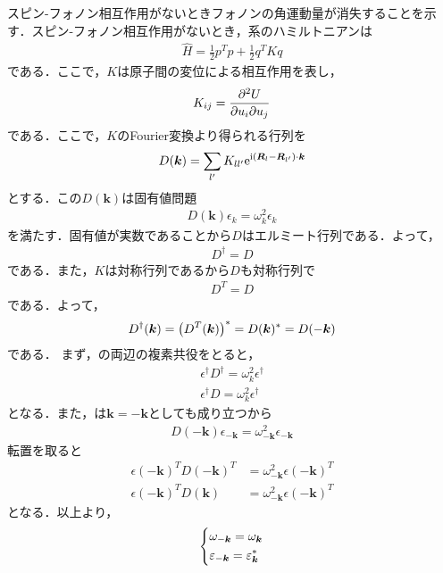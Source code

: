 \documentclass{report}
\begin{document}
スピン-フォノン相互作用がないときフォノンの角運動量が消失することを示す．スピン-フォノン相互作用がないとき，系のハミルトニアンは
\begin{align}
  \hat{H} = \frac{1}{2} p^T p + \frac{1}{2} q^T K q
\end{align}
である．ここで，$K$は原子間の変位による相互作用を表し，
\begin{align}
  K_{ij}  = \pdv[2]{U}{u_i}{u_j}
\end{align}
である．ここで，$K$のFourier変換より得られる行列を
\begin{align}
  D(\bm{k}) = \sum_{l'} K_{ll'} \mathrm{e}^{\mathrm{i}(\bm{R}_l - \bm{R}_{l'})\cdot\bm{k}}
\end{align}
とする．この$D(\bm{k})$は固有値問題
\begin{align}
  D(\bm{k})\epsilon_k = \omega_k^2 \epsilon_k \label{eigen}
\end{align}
を満たす．固有値が実数であることから$D$はエルミート行列である．よって，
\begin{align}
  D^\dagger = D
\end{align}
である．また，$K$は対称行列であるから$D$も対称行列で
\begin{align}
  D^T = D
\end{align}
である．よって，
\begin{align}
  D^\dagger(\bm{k}) = \qty(D^T(\bm{k}))^{*} = D(\bm{k})^{*} = D(-\bm{k})
\end{align}
である．
まず，の両辺の複素共役をとると，
\begin{align}
  \epsilon^\dagger D^\dagger = \omega_k^2 \epsilon^\dagger\\
  \epsilon^\dagger D = \omega_k^2 \epsilon^\dagger
\end{align}
となる．また，は$\bm{k} = -\bm{k}$としても成り立つから
\begin{align}
  D(-\bm{k})\epsilon_{-\bm{k}} = \omega_{-\bm{k}}^2 \epsilon_{-\bm{k}}
\end{align}
転置を取ると
\begin{align}
  \epsilon(-\bm{k})^T D(-\bm{k})^T &= \omega_{-\bm{k}}^2 \epsilon(-\bm{k})^T\\
  \epsilon(-\bm{k})^T D(\bm{k}) &= \omega_{-\bm{k}}^2 \epsilon(-\bm{k})^T
\end{align}
となる．以上より，
\begin{align}
  \begin{dcases}
    \omega_{-\bm{k}} = \omega_{\bm{k}}\\
    \varepsilon_{-\bm{k}} = \varepsilon_{\bm{k}}^{*}
  \end{dcases}
\end{align}
\end{document}
